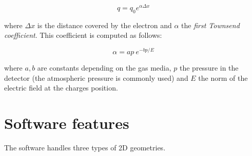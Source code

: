 \documentclass[11pt]{article}
\begin{document}
\[q = q_0 e^{\alpha \Delta x}\]

where $\Delta x$ is the distance covered by the electron and $\alpha$ the
\textit{first Townsend coefficient}. This coefficient is computed as follows:

\[\alpha = ap \ e^{-bp/E}\]

where $a, b$ are constants depending on the gas media, $p$ the pressure in
the detector (the atmospheric pressure is commonly used) and $E$ the norm
of the electric field at the charges position.

\section{Software features}

The software handles three types of 2D geometries.
\end{document}
